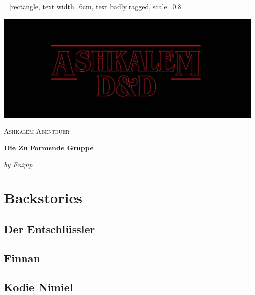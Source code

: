 \documentclass[10pt,twoside,twocolumn,openany]{book}
\begin{document}
	=[rectangle, text width=6cm, text badly ragged, scale=0.8]
	\begin{titlepage} %
		
		\centering
		\includegraphics[width=1\textwidth]{AshkalemLogo}\par\vspace{1cm}
		{\scshape\LARGE Ashkalem Abenteuer \par}
		\vspace{1cm}
		{\huge\bfseries Die Zu Formende Gruppe \par}
		\vspace{2cm}
		{\Large\itshape by Enipip \par}
		
		\vfill
		
		
	\end{titlepage}
	
	\tableofcontents %
	\newpage %
	
	\chapter{Backstories}
	\section{Der Entschlüssler}
	
	\newpage
	\section{Finnan}
	
	\newpage
	\section{Kodie Nimiel}
	
\end{document}
